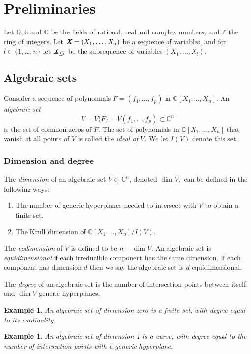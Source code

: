 \documentclass[a4paper]{article}
\def\Xb{\textit{\textbf{X}}}
\newcommand{\ZZ}{{\mathbb{Z}}}
\def\C{\mathbb{C}}
\def\Q{\mathbb{Q}}
\def\R{\mathbb{R}}
\newtheorem{ex}[theorem]{Example}
\begin{document}
\section{Preliminaries}
Let $\Q, \R$ and $\C$ be the fields of rational, real and complex numbers, and $\ZZ$ the ring of integers. Let $\Xb = (X_1, \hdots , X_n)$ be a sequence of variables, and for $l \in \{1,\hdots,n\}$ let $\Xb_{\leq l}$ be the subsequence of variables $(X_1, \hdots , X_l)$.



\subsection{Algebraic sets} 
Consider a sequence of polynomials $F=(f_1,\hdots,f_p)$ in $\C[X_1,\hdots,X_n].$
An \textit{algebraic set} 
\[
V = V\big(F) = V(f_1,\hdots,f_p) \subset \C^n
\]
is the set of common zeros of $F$.  The set of polynomials in $\C[X_1,\hdots, X_n]$ that vanish at all points of $V$ is called the \textit{ideal of $V$.} We let $I(V)$ denote this set.
%
\subsubsection{Dimension and degree}
The \textit{dimension} of an algebraic set $V \subset \C^n$, denoted $\dim V,$ can be defined in the following ways:
\begin{enumerate}
    \item The number of generic hyperplanes needed to intersect with $V$ to obtain a finite set. 
    \item The Krull dimension of $\C[X_1,\hdots,X_n]/I(V)$.
\end{enumerate}
The \textit{codimension} of $V$ is defined to be $n - \dim V$. An algebraic set is \textit{equidimensional} if each irreducible component has the same dimension.  If each component has dimension $d$ then we say the algebraic set is $d$-equidimensional.
\par
The \textit{degree} of an algebraic set is the number of intersection points between itself and $\dim V$ generic hyperplanes.
%
\begin{ex}
An algebraic set of dimension zero is a finite set, with degree equal to its cardinality.
\end{ex}
%
\begin{ex}
An algebraic set of dimension 1 is a curve, with degree equal to the number of intersection points with a generic hyperplane.
\end{ex}
%
\end{document}

